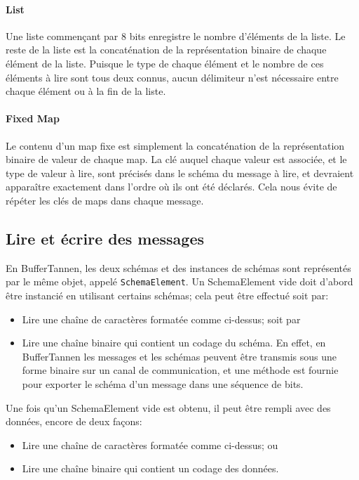 \paragraph{List} Une liste commençant par 8 bits enregistre le nombre d'éléments de la liste. Le reste de la liste est la concaténation de la représentation binaire de chaque élément de la liste. Puisque le type de chaque élément et le nombre de ces éléments à lire sont tous deux connus, aucun délimiteur n'est nécessaire entre chaque élément ou à la fin de la liste.

\paragraph{Fixed Map} Le contenu d'un map fixe est simplement la concaténation de la représentation binaire de valeur de chaque map. La clé auquel chaque valeur est associée, et le type de valeur à lire, sont précisés dans le schéma du message à lire, et devraient apparaître exactement dans l'ordre où ils ont été déclarés. Cela nous évite de répéter les clés de maps dans chaque message.

\subsection{Lire et écrire des messages}

En BufferTannen, les deux schémas et des instances de schémas sont représentés par le même objet, appelé \verb+SchemaElement+. Un SchemaElement vide doit d'abord être instancié en utilisant certains schémas; cela peut être effectué soit par:

\begin{itemize}
\item Lire une chaîne de caractères formatée comme ci-dessus; soit par

\item Lire une chaîne binaire qui contient un codage du schéma. En effet, en BufferTannen les messages et les schémas peuvent être transmis sous une forme binaire sur un canal de communication, et une méthode est fournie pour exporter le schéma d'un message dans une séquence de bits.
\end{itemize}

Une fois qu'un SchemaElement vide est obtenu, il peut être rempli avec des données, encore de deux façons:

\begin{itemize}
\item Lire une chaîne de caractères formatée comme ci-dessus; ou

\item Lire une chaîne binaire qui contient un codage des données.
\end{itemize}

